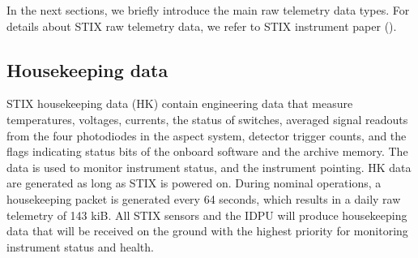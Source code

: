 \documentclass[referee]{aa} %
\begin{document}
In the next sections, we briefly introduce the main raw telemetry data types.
For details about STIX raw telemetry data, we refer to STIX instrument paper (\cite{StixInstrument}).

\subsection{Housekeeping data}
STIX housekeeping data (HK) contain engineering data that measure temperatures, voltages, currents, the status of switches,
averaged signal readouts from the four photodiodes in the aspect system, detector trigger counts, and the flags indicating
status bits of the onboard software and the archive memory.
The data is used to monitor instrument status, and the instrument pointing.
HK data are generated as long as STIX is powered on.
During nominal operations, a housekeeping packet is generated every 64 seconds, which results in a daily raw telemetry of  143 kiB.
All STIX sensors and the IDPU will produce housekeeping data that will be received on the ground with the highest priority
for monitoring instrument status and health.
\end{document}

